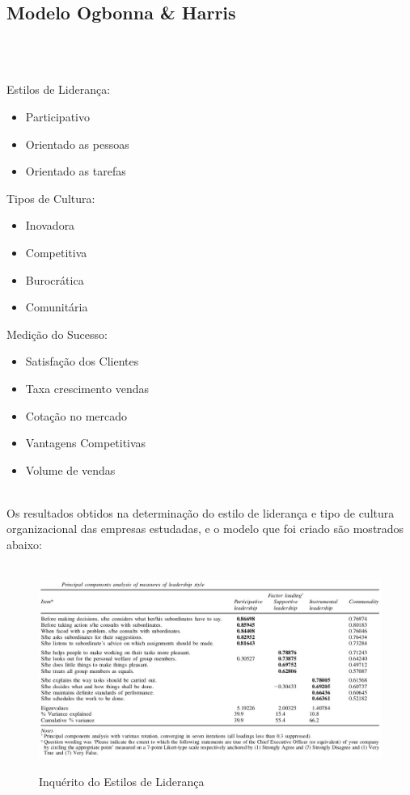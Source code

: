 \subsection{Modelo Ogbonna \& Harris}
 \\
\\
\begin{minipage}[t]{.3\linewidth}
\quad Estilos de Liderança:
\begin{itemize}
\setlength\itemsep{-0.3em}
\item Participativo
\item Orientado as pessoas
\item Orientado as tarefas
\end{itemize}
\end{minipage}
\begin{minipage}[t]{.3\linewidth}
\quad Tipos de Cultura:
\begin{itemize}
\setlength\itemsep{-0.3em}
\item Inovadora
\item Competitiva
\item Burocrática
\item Comunitária
\end{itemize}
\end{minipage}
\begin{minipage}[t]{.3\linewidth}
\quad Medição do Sucesso:
\begin{itemize}
\setlength\itemsep{-0.3em}
\item Satisfação dos Clientes
\item Taxa crescimento vendas
\item Cotação no mercado
\item Vantagens Competitivas
\item Volume de vendas
\end{itemize}
\end{minipage}
\vspace{1cm}\\
Os resultados obtidos na determinação do estilo de liderança e tipo de cultura organizacional das empresas estudadas, e o modelo que foi criado são mostrados abaixo:\\
\\
\begin{figure}[H]
\centering
\includegraphics[scale=.5]{"./image/OB/Leadership.jpg"}\\
\caption{Inquérito do Estilos de Liderança \cite{article_1}}
\end{figure}\par
